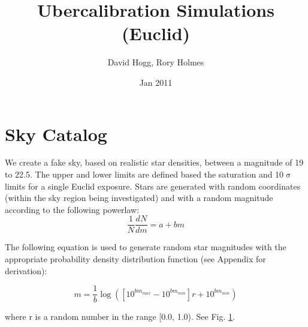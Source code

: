 \documentclass[12pt,a4paper,twoside]{article}
\author{David Hogg, Rory Holmes}
\title{Ubercalibration Simulations \\(Euclid)}
\date{Jan 2011}
\makeatletter
\def\maketitle{%
  \null
  \thispagestyle{empty}%
  \vfill
  \begin{center}\leavevmode
    \normalfont
    {\LARGE \@title\par}%
    \vskip 1cm
    {\Large \@author\par}%
    \vskip 1cm
    {\Large \@date\par}%
  \end{center}%
  \vfill
  \null
  \cleardoublepage
  }
\makeatother
\begin{document}
\maketitle

\section{Sky Catalog}
We create a fake sky, based on realistic star densities, between a magnitude of 19 to 22.5. The upper and lower limits are defined based the saturation and 10$\upsigma$ limits for a single Euclid exposure. Stars are generated with random coordinates (within the sky region being investigated) and with a random magnitude according to the following powerlaw:
\begin{equation}
\frac{1}{N} \frac{dN}{dm} = a + b m
\end{equation}

The following equation is used to generate random star magnitudes with the appropriate probability density distribution function (see Appendix for derivation):

\begin{equation}
m = \frac{1}{b} \log{(\left[ 10^{b m_{max}} - 10^{b m_{min}} \right] r + 10^{b m_{min}})}
\end{equation}

\noindent{}where r is a random number in the range [0.0, 1.0). See Fig. \ref{fig:catalog}. 

\begin{figure}[ht]
\centering
{}
\label{fig:catalog}
\end{figure}
\end{document}
